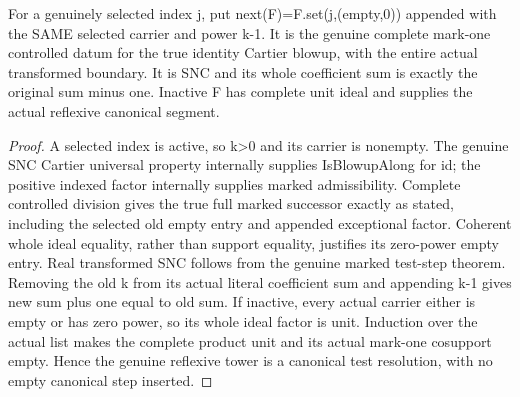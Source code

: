 \begin{lemma}
\label{hir:submersion-ordered-procedure-real-successor}
\leanok
For a genuinely selected index j, put next(F)=F.set(j,(empty,0)) appended
with the SAME selected carrier and power k-1. It is the genuine complete
mark-one controlled datum for the true identity Cartier blowup, with the
entire actual transformed boundary. It is SNC and its whole coefficient
sum is exactly the original sum minus one. Inactive F has complete unit
ideal and supplies the actual reflexive canonical segment.
\end{lemma}
\begin{proof}
A selected index is active, so k>0 and its carrier is nonempty. The genuine
SNC Cartier universal property internally supplies IsBlowupAlong for id;
the positive indexed factor internally supplies marked admissibility.
Complete controlled division gives the true full marked successor exactly
as stated, including the selected old empty entry and appended exceptional
factor. Coherent whole ideal equality, rather than support equality,
justifies its zero-power empty entry. Real transformed SNC follows from
the genuine marked test-step theorem. Removing the old k from its actual
literal coefficient sum and appending k-1 gives new sum plus one equal to
old sum. If inactive, every actual carrier either is empty or has zero
power, so its whole ideal factor is unit. Induction over the actual list
makes the complete product unit and its actual mark-one cosupport empty.
Hence the genuine reflexive tower is a canonical test resolution, with
no empty canonical step inserted.
\end{proof}

